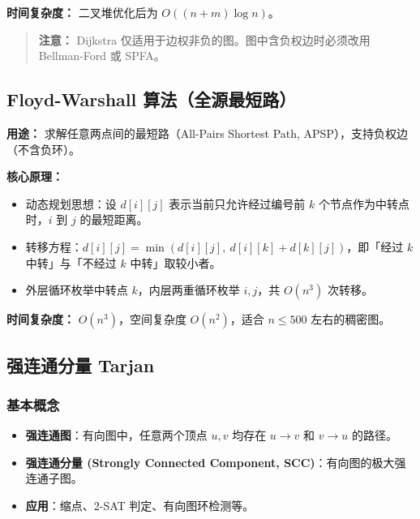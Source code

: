 \textbf{时间复杂度：} 二叉堆优化后为 $O((n + m) \log n)$。

\begin{quote}
\textbf{注意：} Dijkstra 仅适用于边权非负的图。图中含负权边时必须改用 Bellman-Ford 或 SPFA。
\end{quote}



\subsection{Floyd-Warshall 算法（全源最短路）}

\textbf{用途：} 求解任意两点间的最短路（All-Pairs Shortest Path, APSP），支持负权边（不含负环）。

\textbf{核心原理：}

\begin{itemize}
  \item 动态规划思想：设 $d[i][j]$ 表示当前只允许经过编号前 $k$ 个节点作为中转点时，$i$ 到 $j$ 的最短距离。
  \item 转移方程：$d[i][j] = \min(d[i][j],\ d[i][k] + d[k][j])$，即「经过 $k$ 中转」与「不经过 $k$ 中转」取较小者。
  \item 外层循环枚举中转点 $k$，内层两重循环枚举 $i, j$，共 $O(n^3)$ 次转移。
\end{itemize}

\textbf{时间复杂度：} $O(n^3)$，空间复杂度 $O(n^2)$，适合 $n \le 500$ 左右的稠密图。



\subsection{强连通分量 Tarjan}

\subsubsection{基本概念}

\begin{itemize}
  \item \textbf{强连通图}：有向图中，任意两个顶点 $u, v$ 均存在 $u \to v$ 和 $v \to u$ 的路径。
  \item \textbf{强连通分量 (Strongly Connected Component, SCC)}：有向图的极大强连通子图。
  \item \textbf{应用}：缩点、2-SAT 判定、有向图环检测等。
\end{itemize}

